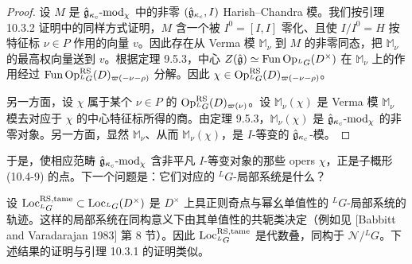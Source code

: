 \begin{proof}
    设 $M$ 是 $\hat{\mathfrak{g}}_{\kappa_c}\text{-}\mathrm{mod}_\chi$ 中的非零 $(\hat{\mathfrak{g}}_{\kappa_c},I)$ Harish--Chandra 模。我们按引理 10.3.2 证明中的同样方式证明，$M$ 含一个被 $I^0=[I,I]$ 零化、且使 $I/I^0=H$ 按特征标 $\nu\in P$ 作用的向量 $v$。因此存在从 Verma 模 $\mathbb{M}_\nu$ 到 $M$ 的非零同态，把 $\mathbb{M}_\nu$ 的最高权向量送到 $v$。根据定理 9.5.3，中心 $Z(\hat{\mathfrak{g}})\simeq\operatorname{Fun}\operatorname{Op}_{{}^L G}(D^\times)$ 在 $\mathbb{M}_\nu$ 上的作用经过 $\operatorname{Fun}\operatorname{Op}^{\mathrm{RS}}_{{}^L G}(D)_{\varpi(-\nu-\rho)}$ 分解。因此 $\chi\in\operatorname{Op}^{\mathrm{RS}}_{{}^L G}(D)_{\varpi(-\nu-\rho)}$。

    另一方面，设 $\chi$ 属于某个 $\nu\in P$ 的 $\operatorname{Op}^{\mathrm{RS}}_{{}^L G}(D)_{\varpi(\nu)}$。设 $\mathbb{M}_\nu(\chi)$ 是 Verma 模 $\mathbb{M}_\nu$ 模去对应于 $\chi$ 的中心特征标所得的商。由定理 9.5.3，$\mathbb{M}_\nu(\chi)$ 是 $\hat{\mathfrak{g}}_{\kappa_c}\text{-}\mathrm{mod}_\chi$ 的非零对象。另一方面，显然 $\mathbb{M}_\nu$、从而 $\mathbb{M}_\nu(\chi)$，是 $I$-等变的 $\hat{\mathfrak{g}}_{\kappa_c}$-模。
\end{proof}

于是，使相应范畴 $\hat{\mathfrak{g}}_{\kappa_c}\text{-}\mathrm{mod}_\chi$ 含非平凡 $I$-等变对象的那些 opers $\chi$，正是子概形 (10.4-9) 的点。下一个问题是：它们对应的 ${}^L G$-局部系统是什么？

设 $\operatorname{Loc}^{\mathrm{RS,tame}}_{{}^L G}\subset\operatorname{Loc}_{{}^L G}(D^\times)$ 是 $D^\times$ 上具正则奇点与幂幺单值性的 ${}^L G$-局部系统的轨迹。这样的局部系统在同构意义下由其单值性的共轭类决定（例如见 [Babbitt and Varadarajan 1983] 第 8 节）。因此 $\operatorname{Loc}^{\mathrm{RS,tame}}_{{}^L G}$ 是代数叠，同构于 $\mathcal{N}/{}^L G$。下述结果的证明与引理 10.3.1 的证明类似。

